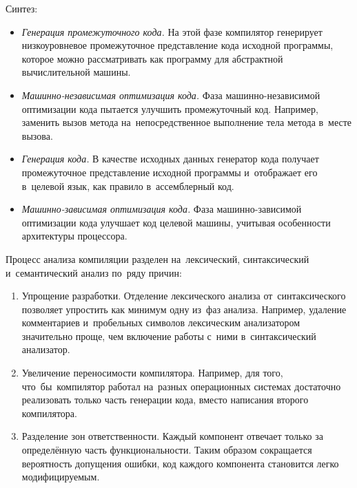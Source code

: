 Синтез:
\begin{itemize}	
\item{\textit{Генерация промежуточного кода.} На этой фазе компилятор генерирует низкоуровневое промежуточное представление кода исходной программы, которое можно рассматривать как программу для абстрактной вычислительной машины.}	
\item{\textit{Машинно-независимая оптимизация кода.} Фаза машинно-независимой оптимизации кода пытается улучшить промежуточный код. Например, заменить вызов метода на~непосредственное выполнение тела метода в~месте вызова.}	
\item{\textit{Генерация кода.} В качестве исходных данных генератор кода получает промежуточное представление исходной программы и~отображает его в~целевой язык, как правило в~ассемблерный код.}
\item{\textit{Машинно-зависимая оптимизация кода.} Фаза машинно-зависимой оптимизации кода улучшает код целевой машины, учитывая особенности архитектуры процессора.}		
\end{itemize}


Процесс анализа компиляции разделен на~лексический, синтаксический и~семантический анализ по~ряду причин: 

\begin{enumerate} 
	\item{Упрощение разработки. Отделение лексического анализа от~синтаксического позволяет упростить как минимум одну из~фаз анализа. Например, удаление комментариев и~пробельных символов лексическим анализатором значительно проще, чем включение работы с~ними в~синтаксический анализатор.}
	\item{Увеличение переносимости компилятора. Например, для того, что~бы~компилятор работал на~разных операционных системах достаточно реализовать только часть генерации кода, вместо написания второго компилятора.}
	\item{Разделение зон ответственности. Каждый компонент отвечает только за определённую часть функциональности. Таким образом сокращается вероятность допущения ошибки, код каждого компонента становится легко модифицируемым. }
\end{enumerate}
